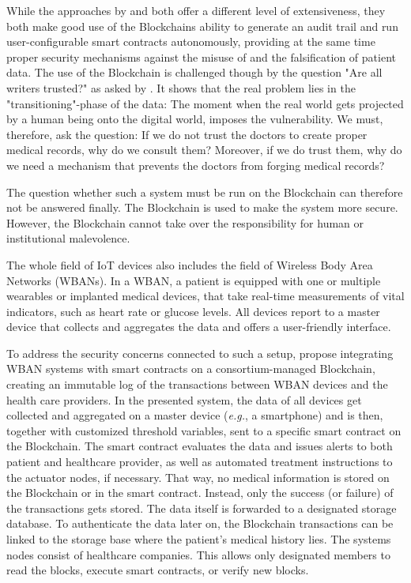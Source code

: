 While the approaches by \cite{Cao2019} and \cite{Azaria2016} both offer a different level of extensiveness, they both make good use of the Blockchains ability to generate an audit trail and run user-configurable smart contracts autonomously, providing at the same time proper security mechanisms against the misuse of and the falsification of patient data.
The use of the Blockchain is challenged though by the question "Are all writers trusted?" as asked by \cite{Wust2017}. It shows that the real problem lies in the "transitioning"-phase of the data: The moment when the real world gets projected by a human being onto the digital world, imposes the vulnerability. We must, therefore, ask the question: If we do not trust the doctors to create proper medical records, why do we consult them? Moreover, if we do trust them, why do we need a mechanism that prevents the doctors from forging medical records?

The question whether such a system must be run on the Blockchain can therefore not be answered finally. The Blockchain is used to make the system more secure. However, the Blockchain cannot take over the responsibility for human or institutional malevolence.

The whole field of IoT devices also includes the field of Wireless Body Area Networks (WBANs). In a WBAN, a patient is equipped with one or multiple wearables or implanted medical devices, that take real-time measurements of vital indicators, such as heart rate or glucose levels. All devices report to a master device that collects and aggregates the data and offers a user-friendly interface.

To address the security concerns connected to such a setup, \cite{Baccarini2018} propose integrating WBAN systems with smart contracts on a consortium-managed Blockchain, creating an immutable log of the transactions between WBAN devices and the health care providers. \cite{Baccarini2018}
In the presented system, the data of all devices get collected and aggregated on a master device (\textit{e.g.}, a smartphone) and is then, together with customized threshold variables, sent to a specific smart contract on the Blockchain. The smart contract evaluates the data and issues alerts to both patient and healthcare provider, as well as automated treatment instructions to the actuator nodes, if necessary.
That way, no medical information is stored on the Blockchain or in the smart contract. Instead, only the success (or failure) of the transactions gets stored. The data itself is forwarded to a designated storage database.
To authenticate the data later on, the Blockchain transactions can be linked to the storage base where the patient's medical history lies.
The systems nodes consist of healthcare companies. This allows only designated members to read the blocks, execute smart contracts, or verify new blocks.

